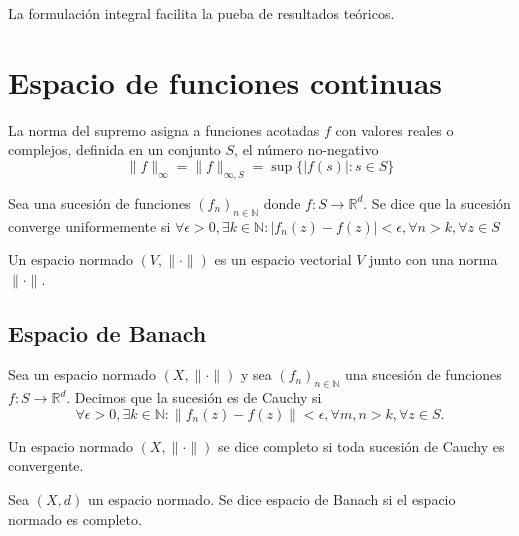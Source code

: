 \begin{obs}
  La formulación integral facilita la pueba de resultados teóricos.
\end{obs}

\section{Espacio de funciones continuas}

\begin{defn}
  La norma del supremo asigna a funciones acotadas $f$ con valores reales o complejos, definida en un conjunto $S$, el número no-negativo 
  \[ 
    \| f \|_{\infty} = \| f \|_{\infty, S} = \sup \{ |f(s)|: s \in S \} 
  \] 
  
\end{defn}

\begin{defn}
  Sea una sucesión de funciones $( f_{n} )_{n \in \mathbb{N}}$ donde $f: S \to \mathbb{R}^{d}$. Se dice que la sucesión converge uniformemente si $\forall \epsilon > 0, \exists k \in \mathbb{N}: |f_{n}(z) - f(z)| < \epsilon, \forall n > k, \forall z \in S $
\end{defn}

\begin{defn}
  Un espacio normado $( V, \| \cdot \| )$ es un espacio vectorial $V$ junto con una norma $ \| \cdot \|$.
\end{defn}

\subsection{Espacio de Banach}

\begin{defn}
  Sea un espacio normado $(X, \| \cdot \|)$ y sea $(f_{n})_{n \in \mathbb{N}}$ una sucesión de funciones $f: S \to \mathbb{R}^{d}$. Decimos que la sucesión es de Cauchy si 
  \[ 
    \forall \epsilon > 0, \exists k \in \mathbb{N}: \| f_{n}(z)-f(z) \| < \epsilon, \forall m,n > k, \forall z \in S.
  \] 
  
\end{defn}

\begin{defn}
  Un espacio normado $(X, \| \cdot \|)$ se dice completo si toda sucesión de Cauchy es convergente.
\end{defn}

\begin{defn}
  Sea $(X, d)$ un espacio normado. Se dice espacio de Banach si el espacio normado es completo.
\end{defn}


